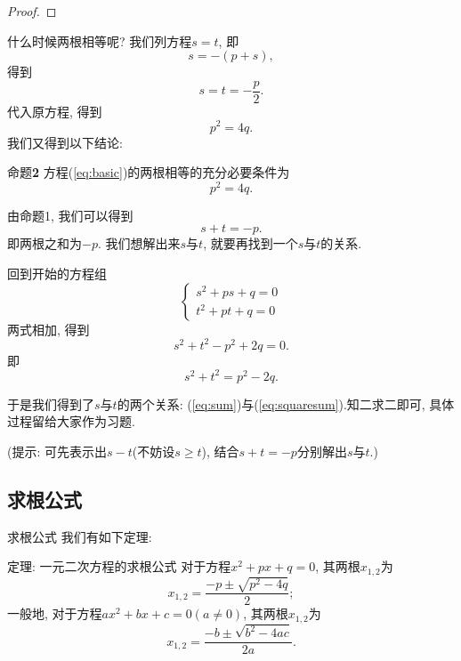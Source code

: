 \documentclass[serif]{beamer}
\begin{document}
\begin{frame}
	\begin{proof}
		\vspace*{6cm}
	\end{proof}
\end{frame}

\begin{frame}
	什么时候两根相等呢?
	我们列方程$s=t$, 即
	\[s=-(p+s),\]
	得到
	\[s=t=-\frac{p}{2}.\]
	代入原方程, 得到
	\[p^2=4q.\]
	我们又得到以下结论:
	\begin{block}{{\heiti 命题}\textbf{2}}
		方程(\ref{eq:basic})的两根相等的充分必要条件为
		\[p^2=4q.\]
	\end{block}
\end{frame}

\begin{frame}
	由命题1, 我们可以得到
	\begin{equation}
		s+t=-p.\label{eq:sum}
	\end{equation}
	即两根之和为$-p$. 我们想解出来$s$与$t$, 就要再找到一个$s$与$t$的关系.\par
	回到开始的方程组
	\[\begin{cases}
		s^2+ps+q=0\\
		t^2+pt+q=0
	\end{cases}\]
	两式相加, 得到
	\[s^2+t^2-p^2+2q=0.\]
	即
	\begin{equation}
		s^2+t^2=p^2-2q.\label{eq:squaresum}
	\end{equation}
\end{frame}

\begin{frame}
	于是我们得到了$s$与$t$的两个关系: (\ref{eq:sum})与(\ref{eq:squaresum}).知二求二即可, 具体过程留给大家作为习题.\par
	(提示: 可先表示出$s-t$(不妨设$s\ge t$), 结合$s+t=-p$分别解出$s$与$t$.)
\end{frame}

\subsection{\kaishu 求根公式}

\begin{frame}{\kaishu 求根公式}
	我们有如下定理:
	\begin{block}{{\heiti 定理}: {\fangsong 一元二次方程的求根公式}}
		\kaishu
		对于方程$x^2+px+q=0$, 其两根$x_{1,2}$为
		\[x_{1,2}=\frac{-p\pm\sqrt{p^2-4q}}{2};\]
		一般地, 对于方程$ax^2+bx+c=0 (a\neq 0)$, 其两根$x_{1,2}$为
		\[x_{1,2}=\frac{-b\pm\sqrt{b^2-4ac}}{2a}.\]
	\end{block}
\end{frame}
\end{document}
